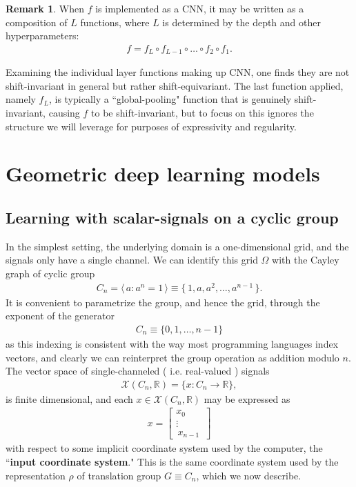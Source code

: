\documentclass[12pt]{article}
\numberwithin{equation}{section}
\theoremstyle{definition}
\newtheorem{rmk}[thm]{Remark}
\newcommand{		\R		}	{	\mathbb{R}				}
\newcommand{		\cX		}	{	\mathcal{X}				}
\newcommand{		\eq		}[1]	{	\begin{align*}#1\end{align*}	}%
\newcommand{		\ra		}	{	\rangle					}
\newcommand{		\la		}	{	\langle					}
\newcommand{		\B		}	{\textbf					} %
\newcommand{		\Oh		}	{	\Omega					}
\newcommand{		\1		}	{	\bm{1}					}%
\begin{document}
\begin{rmk} When $f$ is implemented as a CNN, it may be written as a composition of $L$ functions, where $L$ is determined by the depth and other hyperparameters:
\eq{
f = f_L \circ f_{L-1} \circ \dots \circ f_2 \circ f_1 .
}

Examining the individual layer functions making up CNN, one finds they are not shift-invariant in general but rather shift-equivariant. The last function applied, namely $f_L$, is typically a ``global-pooling" function that is genuinely shift-invariant, causing $f$ to be shift-invariant, but to focus on this ignores the structure we will leverage for purposes of expressivity and regularity. 
\end{rmk}


\newpage

\section{Geometric deep learning models} 

\subsection{Learning with scalar-signals on a cyclic group}


In the simplest setting, the underlying domain is a one-dimensional grid, and the signals only have a single channel. We can identify this grid $\Oh$ with the Cayley graph of cyclic group
\eq{
C_n = \la \, a : a^n = 1 \, \ra \equiv \{ \, 1, a, a^2, \dots, a^{n-1} \, \}.
}
It is convenient to parametrize the group, and hence the grid, through the exponent of the generator 
 \eq{
 C_n \equiv \{ 0, 1, \dots, n -1 \}
 } 
as this indexing is consistent with the way most programming languages index vectors, and clearly we can reinterpret the group operation as addition modulo $n$. The vector space of single-channeled ( i.e. real-valued ) signals
\eq{
\cX(C_n,\R) = \{ x : C_n \to \R \} ,
}
is finite dimensional, and each $x \in \cX(C_n, \R)$ may be expressed as 
\eq{
x = 
\left[ 
\begin{matrix}
x_0\\ 
\vdots\\
\,x_{n-1}\,
\end{matrix}
\right] 
}
with respect to some implicit coordinate system used by the computer, the ``\B{input coordinate system}." This is the same coordinate system used by the representation $\rho$ of translation group $G \equiv C_n$, which we now describe. 
\end{document}
